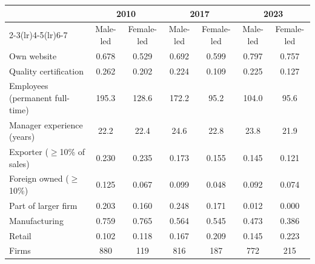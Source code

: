 \begin{tabular}{lcccccc}
\toprule
 & \multicolumn{2}{c}{2010} & \multicolumn{2}{c}{2017} & \multicolumn{2}{c}{2023} \\
\cmidrule(lr){2-3}\cmidrule(lr){4-5}\cmidrule(lr){6-7}
 & Male-led & Female-led & Male-led & Female-led & Male-led & Female-led \\
\midrule
Own website & 0.678 & 0.529 & 0.692 & 0.599 & 0.797 & 0.757 \\
Quality certification & 0.262 & 0.202 & 0.224 & 0.109 & 0.225 & 0.127 \\
\addlinespace
Employees (permanent full-time) & 195.3 & 128.6 & 172.2 & 95.2 & 104.0 & 95.6 \\
Manager experience (years) & 22.2 & 22.4 & 24.6 & 22.8 & 23.8 & 21.9 \\
Exporter ($\geq$10\% of sales) & 0.230 & 0.235 & 0.173 & 0.155 & 0.145 & 0.121 \\
Foreign owned ($\geq$10\%) & 0.125 & 0.067 & 0.099 & 0.048 & 0.092 & 0.074 \\
Part of larger firm & 0.203 & 0.160 & 0.248 & 0.171 & 0.012 & 0.000 \\
Manufacturing & 0.759 & 0.765 & 0.564 & 0.545 & 0.473 & 0.386 \\
Retail & 0.102 & 0.118 & 0.167 & 0.209 & 0.145 & 0.223 \\
\midrule
Firms & 880 & 119 & 816 & 187 & 772 & 215 \\
\bottomrule
\end{tabular}
